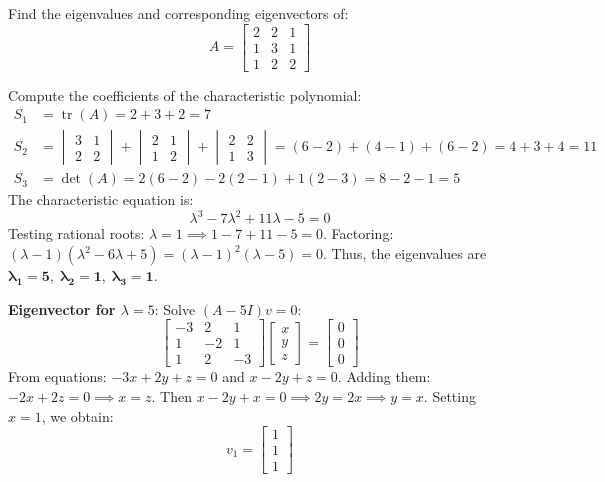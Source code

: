 \begin{example}
Find the eigenvalues and corresponding eigenvectors of:
\begin{equation}
A = \begin{bmatrix}
2 & 2 & 1 \\
1 & 3 & 1 \\
1 & 2 & 2
\end{bmatrix}
\end{equation}
\end{example}

\begin{solutionbox}
Compute the coefficients of the characteristic polynomial:
\begin{align}
S_1 &= \operatorname{tr}(A) = 2 + 3 + 2 = 7 \\
S_2 &= \begin{vmatrix} 3 & 1 \\ 2 & 2 \end{vmatrix} + \begin{vmatrix} 2 & 1 \\ 1 & 2 \end{vmatrix} + \begin{vmatrix} 2 & 2 \\ 1 & 3 \end{vmatrix} = (6 - 2) + (4 - 1) + (6 - 2) = 4 + 3 + 4 = 11 \\
S_3 &= \det(A) = 2(6-2) - 2(2-1) + 1(2-3) = 8 - 2 - 1 = 5
\end{align}
The characteristic equation is:
\begin{equation}
\lambda^3 - 7\lambda^2 + 11\lambda - 5 = 0
\end{equation}
Testing rational roots: $\lambda = 1 \implies 1 - 7 + 11 - 5 = 0$.
Factoring: $(\lambda - 1)(\lambda^2 - 6\lambda + 5) = (\lambda - 1)^2(\lambda - 5) = 0$.
Thus, the eigenvalues are $\mathbf{\lambda_1 = 5, \; \lambda_2 = 1, \; \lambda_3 = 1}$.

\textbf{Eigenvector for $\lambda = 5$}:
Solve $(A - 5I) v = 0$:
\begin{equation}
\begin{bmatrix}
-3 & 2 & 1 \\
1 & -2 & 1 \\
1 & 2 & -3
\end{bmatrix} \begin{bmatrix} x \\ y \\ z \end{bmatrix} = \begin{bmatrix} 0 \\ 0 \\ 0 \end{bmatrix}
\end{equation}
From equations: $-3x + 2y + z = 0$ and $x - 2y + z = 0$.
Adding them: $-2x + 2z = 0 \implies x = z$.
Then $x - 2y + x = 0 \implies 2y = 2x \implies y = x$.
Setting $x = 1$, we obtain:
\begin{equation}
v_1 = \begin{bmatrix} 1 \\ 1 \\ 1 \end{bmatrix}
\end{equation}


\end{solutionbox}
